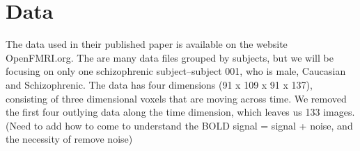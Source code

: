 \section{Data}

The data used in their published paper is available on the website OpenFMRI.org.
The are many data files grouped by subjects, but we will be focusing on only one
schizophrenic subject--subject 001, who is male, Caucasian and Schizophrenic.
The data has four dimensions (91 x 109 x 91 x 137), consisting of three dimensional voxels that are moving
across time. We removed the first four outlying data along the time dimension,
which leaves us 133 images. (Need to add how to come to understand the BOLD
signal = signal + noise, and the necessity of remove noise)

